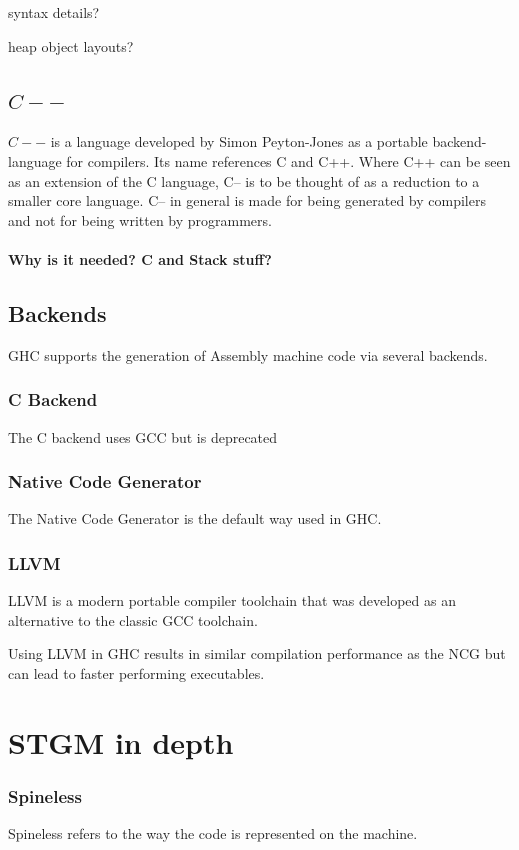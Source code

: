 \documentclass[runningheads]{llncs}
\begin{document}
syntax details?

heap object layouts?


\subsection{$C--$}
$C - - $ is a language developed by Simon Peyton-Jones as a portable backend-language for compilers. Its name references C and C++. Where C++ can be seen as an extension of the C language, C-- is to be thought of as a reduction to a smaller core language. C-- in general is made for being generated by compilers and not for being written by programmers.

\paragraph{Why is it needed? C and Stack stuff?}


\subsection{Backends}
GHC supports the generation of Assembly machine code via several backends.


\subsubsection{C Backend}
The C backend uses GCC but is deprecated

\subsubsection{Native Code Generator}
The Native Code Generator is the default way used in GHC.

\subsubsection{LLVM}
LLVM is a modern portable compiler toolchain that was developed as an alternative to the classic GCC toolchain.

Using LLVM in GHC results in similar compilation performance as the NCG but can lead to faster performing executables.

\section{STGM in depth}

\subsubsection{Spineless}
Spineless refers to the way the code is represented on the machine.
\end{document}
